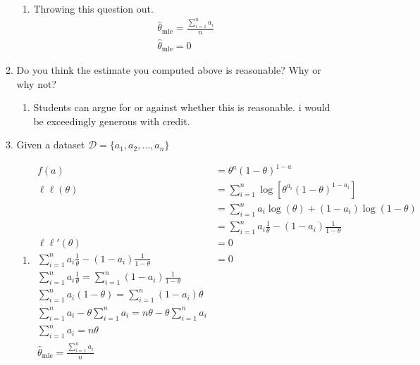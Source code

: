 \documentclass[krantz1,ChapterTOCs]{krantz}
\begin{document}
\begin{enumerate}
\begin{enumerate}
        \begin{enumerate}
            \item { \color{red} Throwing this question out.
            \begin{align}
                \hat{\theta}_{\text{mle}} = \frac{\sum_{i=1}^{n} a_{i}}{n}\\
                \hat{\theta}_{\text{mle}} =0\
            \end{align}
            }
        \end{enumerate}
        \item Do you think the estimate you computed above is reasonable? Why or why not?
        
        \begin{enumerate}
            \item { \color{red} Students can argue for or against whether this is reasonable. i would be exceedingly generous with credit. }
        \end{enumerate}
        
        \item Given a dataset $\mathcal{D} = \{a_{1}, a_{2}, \dots, a_{n}\}$
        
        \begin{enumerate}
            \item { \color{red}
            
            \begin{align}
                f(a) &= \theta^{a}(1-\theta)^{1-a}\\
                \ell \ell (\theta) &= \sum_{i=1}^{n} \log \left[ \theta^{a_{i}}(1-\theta)^{1-a_{i}} \right] \\
                &= \sum_{i=1}^{n} a_{i} \log(\theta) + (1-a_{i} ) \log(1-\theta) \\
                &= \sum_{i=1}^{n} a_{i} \frac{1}{\theta} - (1-a_{i})  \frac{1}{1-\theta}\\
                \ell \ell '(\theta) &= 0 \\
                \sum_{i=1}^{n} a_{i} \frac{1}{\theta} - (1-a_{i})  \frac{1}{1-\theta} &=0\\
                \sum_{i=1}^{n} a_{i} \frac{1}{\theta} = \sum_{i=1}^{n}(1-a_{i})  \frac{1}{1-\theta} \\
                \sum_{i=1}^{n} a_{i} (1-\theta) = \sum_{i=1}^{n}(1-a_{i})  \theta \\
                \sum_{i=1}^{n} a_{i} -\theta \sum_{i=1}^{n} a_{i}  = n\theta  -\theta \sum_{i=1}^{n}a_{i}  \\
                \sum_{i=1}^{n} a_{i}  = n\theta \\
                \hat{\theta}_{\text{mle}} = \frac{\sum_{i=1}^{n} a_{i}}{n}
            \end{align}
            
}
\end{enumerate}
\end{enumerate}
\end{enumerate}
\end{document}

